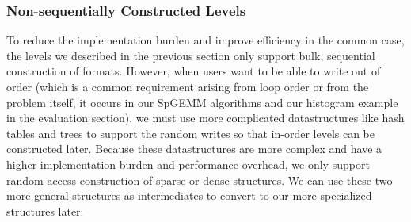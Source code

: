 \subsubsection{Non-sequentially Constructed Levels}
To reduce the implementation burden and improve efficiency in the common case, the levels we described in the previous section only support bulk,
sequential construction of formats. However, when users want to be able to write out
of order (which is a common requirement arising from loop order or from the
problem itself, it occurs in our SpGEMM algorithms and our histogram example in
the evaluation section), we must use more complicated datastructures like hash
tables and trees to support the random writes so that in-order levels can be constructed later. Because these datastructures are more complex and have a higher implementation burden and performance overhead,
we only support random access construction of sparse or dense structures.  We
can use these two more general structures as intermediates to convert to our
more specialized structures later.






